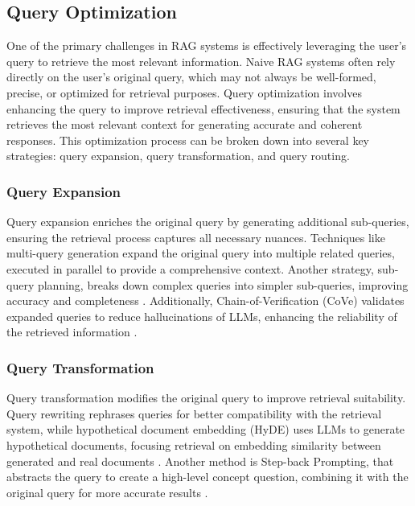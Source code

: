 \subsection{Query Optimization}

One of the primary challenges in RAG systems is effectively leveraging the user's query to retrieve the most relevant information. Naive RAG systems often rely directly on the user’s original query, which may not always be well-formed, precise, or optimized for retrieval purposes. Query optimization involves enhancing the query to improve retrieval effectiveness, ensuring that the system retrieves the most relevant context for generating accurate and coherent responses. This optimization process can be broken down into several key strategies: query expansion, query transformation, and query routing.

\subsubsection{Query Expansion}

Query expansion enriches the original query by generating additional sub-queries, ensuring the retrieval process captures all necessary nuances. Techniques like multi-query generation expand the original query into multiple related queries, executed in parallel to provide a comprehensive context. Another strategy, sub-query planning, breaks down complex queries into simpler sub-queries, improving accuracy and completeness \cite{zhou2022least}. Additionally, Chain-of-Verification (CoVe) validates expanded queries to reduce hallucinations of LLMs, enhancing the reliability of the retrieved information \cite{dhuliawala2023chain}.

\subsubsection{Query Transformation}

Query transformation modifies the original query to improve retrieval suitability. Query rewriting rephrases queries for better compatibility with the retrieval system, while hypothetical document embedding (HyDE) uses LLMs to generate hypothetical documents, focusing retrieval on embedding similarity between generated and real documents \cite{gao2022precise}. Another method is Step-back Prompting, that abstracts the query to create a high-level concept question, combining it with the original query for more accurate results \cite{zheng2023take}.

